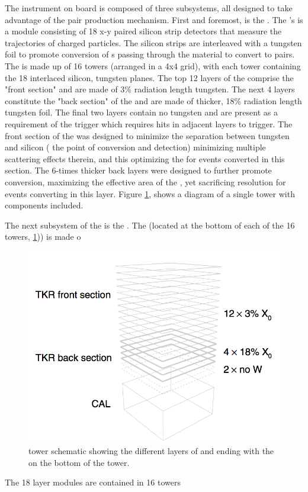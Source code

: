 The \lat{} instrument on board \Fermi{} is composed of three subsystems, all designed to take advantage of the pair production mechanism. First and foremost, is the \tkr{}. The \lat{}'s \tkr{} is a module consisting of 18 x-y paired silicon strip detectors that measure the trajectories of charged particles. The silicon strips are interleaved with a tungsten foil to promote conversion of \gam{}s passing through the material to convert to \ee{} pairs. The \lat{} is made up of 16 towers (arranged in a 4x4 grid), with each tower containing the 18 interlaced silicon, tungsten planes. The top 12 layers of the \tkr{} comprise the "front section" and are made of 3\% radiation length tungsten. The next 4 layers constitute the "back section" of the \tkr{} and are made of thicker, 18\% radiation length tungsten foil. The final two \tkr{} layers contain no tungsten and are present as a requirement of the \tkr{} trigger which requires hits in adjacent layers to trigger. The front section of the \tkr{} was designed to minimize the separation between tungsten and silicon (\ie{} the point of conversion and detection) minimizing multiple scattering effects therein, and this optimizing the \psf{} for events converted in this section. The 6-times thicker back layers were designed to further promote conversion, maximizing the effective area of the \lat{}, yet sacrificing resolution for events converting in this layer. Figure \ref{fig:Tower}, shows a diagram of a single tower with \tkr{} components included.

The next subsystem of the \lat{} is the \cal{}. The \cal{} (located at the bottom of each of the 16 towers, \ref{fig:Tower})) is made o

\begin{figure}[ht!]
	\centering
	\includegraphics[width=1.0\columnwidth]{Figures/latPerf_Tower.png}
	\caption[\lat{} tower schematic ]{\lat{} tower schematic showing the different layers of \tkr{} and ending with the \cal{} on the bottom of the tower. }
	\label{fig:Tower}
\end{figure}
The 18 layer modules are contained in 16 towers

